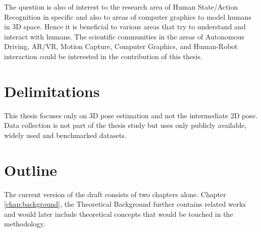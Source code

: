 The question is also of interest to the research area of Human State/Action Recognition in specific and also to areas of computer graphics to model humans in 3D space. Hence it is beneficial to various areas that try to understand and interact with humans. The scientific communities in the areas of Autonomous Driving, \ac{AR/VR}, Motion Capture, Computer Graphics, and Human-Robot interaction could be interested in the contribution of this thesis.

\section{Delimitations}
This thesis focuses only on 3D pose estimation and not the intermediate 2D pose. Data collection is not part of the thesis study but uses only publicly available, widely used and benchmarked datasets. 

\section{Outline}
The current version of the draft consists of two chapters alone. Chapter \ref{chap:background}, the Theoretical Background further contains related works and would later include theoretical concepts that would be touched in the methodology.
